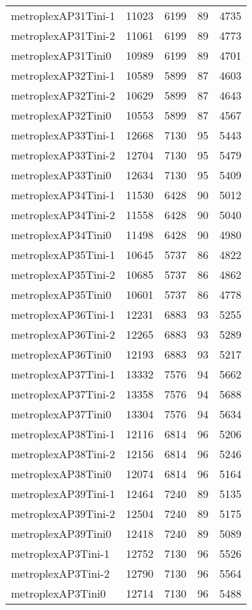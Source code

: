 \documentclass[../../../thesis.tex]{subfiles}
\begin{document}
\begin{longtable}{lrrrr}
metroplexAP31Tini-1 & 11023 & 6199 & 89 & 4735 \\
metroplexAP31Tini-2 & 11061 & 6199 & 89 & 4773 \\
metroplexAP31Tini0 & 10989 & 6199 & 89 & 4701 \\
metroplexAP32Tini-1 & 10589 & 5899 & 87 & 4603 \\
metroplexAP32Tini-2 & 10629 & 5899 & 87 & 4643 \\
metroplexAP32Tini0 & 10553 & 5899 & 87 & 4567 \\
metroplexAP33Tini-1 & 12668 & 7130 & 95 & 5443 \\
metroplexAP33Tini-2 & 12704 & 7130 & 95 & 5479 \\
metroplexAP33Tini0 & 12634 & 7130 & 95 & 5409 \\
metroplexAP34Tini-1 & 11530 & 6428 & 90 & 5012 \\
metroplexAP34Tini-2 & 11558 & 6428 & 90 & 5040 \\
metroplexAP34Tini0 & 11498 & 6428 & 90 & 4980 \\
metroplexAP35Tini-1 & 10645 & 5737 & 86 & 4822 \\
metroplexAP35Tini-2 & 10685 & 5737 & 86 & 4862 \\
metroplexAP35Tini0 & 10601 & 5737 & 86 & 4778 \\
metroplexAP36Tini-1 & 12231 & 6883 & 93 & 5255 \\
metroplexAP36Tini-2 & 12265 & 6883 & 93 & 5289 \\
metroplexAP36Tini0 & 12193 & 6883 & 93 & 5217 \\
metroplexAP37Tini-1 & 13332 & 7576 & 94 & 5662 \\
metroplexAP37Tini-2 & 13358 & 7576 & 94 & 5688 \\
metroplexAP37Tini0 & 13304 & 7576 & 94 & 5634 \\
metroplexAP38Tini-1 & 12116 & 6814 & 96 & 5206 \\
metroplexAP38Tini-2 & 12156 & 6814 & 96 & 5246 \\
metroplexAP38Tini0 & 12074 & 6814 & 96 & 5164 \\
metroplexAP39Tini-1 & 12464 & 7240 & 89 & 5135 \\
metroplexAP39Tini-2 & 12504 & 7240 & 89 & 5175 \\
metroplexAP39Tini0 & 12418 & 7240 & 89 & 5089 \\
metroplexAP3Tini-1 & 12752 & 7130 & 96 & 5526 \\
metroplexAP3Tini-2 & 12790 & 7130 & 96 & 5564 \\
metroplexAP3Tini0 & 12714 & 7130 & 96 & 5488 \\

\end{longtable}
\end{document}

